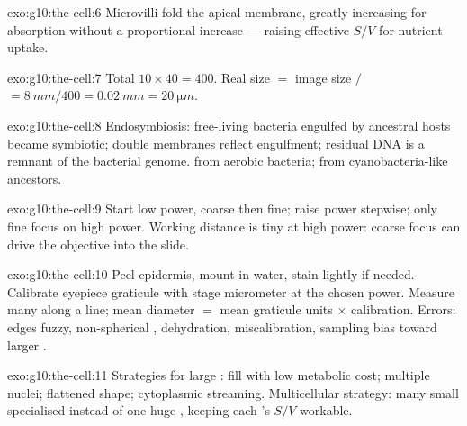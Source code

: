 \begin{solution}{exo:g10:the-cell:6}
Microvilli fold the apical membrane, greatly increasing  for
absorption without a proportional  increase --- raising effective
$S/V$ for nutrient uptake.
\end{solution}

\begin{solution}{exo:g10:the-cell:7}
Total  $10\times 40=400$. Real size $=$ image size $/$
 $= \qty{8}{mm}/400 = \qty{0.02}{mm} = \qty{20}{\micro m}$.
\end{solution}

\begin{solution}{exo:g10:the-cell:8}
Endosymbiosis: free-living bacteria engulfed by ancestral hosts became
symbiotic; double membranes reflect engulfment; residual DNA is a remnant
of the bacterial genome.  from aerobic bacteria; 
from cyanobacteria-like ancestors.
\end{solution}

\begin{solution}{exo:g10:the-cell:9}
Start low power, coarse then fine; raise power stepwise; only fine focus
on high power. Working distance is tiny at high power: coarse focus can
drive the objective into the slide.
\end{solution}

\begin{solution}{exo:g10:the-cell:10}
Peel epidermis, mount in water, stain lightly if needed. Calibrate
eyepiece graticule with stage micrometer at the chosen power. Measure many
 along a line; mean diameter $=$ mean graticule units $\times$
calibration. Errors:  edges fuzzy, non-spherical , dehydration,
miscalibration, sampling bias toward larger .
\end{solution}

\begin{solution}{exo:g10:the-cell:11}
Strategies for large :  fill  with low metabolic cost;
multiple nuclei; flattened shape; cytoplasmic streaming. Multicellular
strategy: many small specialised  instead of one huge , keeping
each 's $S/V$ workable.
\end{solution}

